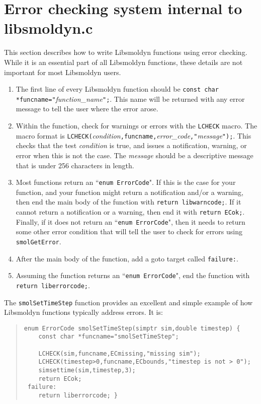 \documentclass {book}
\begin{document}
\section{Error checking system internal to libsmoldyn.c}

This section describes how to write Libsmoldyn functions using error checking. While it is an essential part of all Libsmoldyn functions, these details are not important for most Libsmoldyn users.

\begin{enumerate}
\item The first line of every Libsmoldyn function should be \texttt{const char *funcname="}\emph{function\_name}\texttt{";}. This name will be returned with any error message to tell the user where the error arose.
\item Within the function, check for warnings or errors with the \texttt{LCHECK} macro. The macro format is \texttt{LCHECK(}\emph{condition}\texttt{,funcname,}\emph{error\_code}\texttt{,"}\emph{message}\texttt{");}. This checks that the test \emph{condition} is true, and issues a notification, warning, or error when this is not the case. The \emph{message} should be a descriptive message that is under 256 characters in length.
\item Most functions return an ``\texttt{enum ErrorCode}". If this is the case for your function, and your function might return a notification and/or a warning, then end the main body of the function with \texttt{return libwarncode;}. If it cannot return a notification or a warning, then end it with \texttt{return ECok;}. Finally, if it does not return an ``\texttt{enum ErrorCode}", then it needs to return some other error condition that will tell the user to check for errors using \texttt{smolGetError}.
\item After the main body of the function, add a goto target called \texttt{failure:}.
\item Assuming the function returns an ``\texttt{enum ErrorCode}", end the function with \texttt{return liberrorcode;}.
\end{enumerate}

The \texttt{smolSetTimeStep} function provides an excellent and simple example of how Libsmoldyn functions typically address errors. It is:

\begin{quote}
\begin{lstlisting}
enum ErrorCode smolSetTimeStep(simptr sim,double timestep) {
	const char *funcname="smolSetTimeStep";

	LCHECK(sim,funcname,ECmissing,"missing sim");
	LCHECK(timestep>0,funcname,ECbounds,"timestep is not > 0");
	simsettime(sim,timestep,3);
	return ECok;
 failure:
	return liberrorcode; }
\end{lstlisting}
\end{quote}
\end{document}

